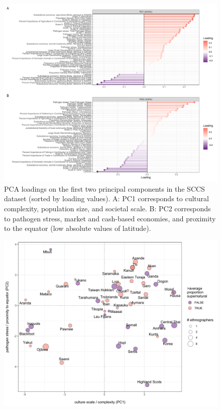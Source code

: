 \documentclass[
  11pt,
]{article}
\begin{document}
\begin{landscape}

\begin{figure}[p]

{\centering \includegraphics{magic-healers-article2_files/figure-latex/sccsPCAloadings-1} 

}

\caption{PCA loadings on the first two principal components in the SCCS dataset (sorted by loading values). A: PC1 corresponds to cultural complexity, population size, and societal scale. B: PC2 corresponds to pathogen stress, market and cash-based economies, and proximity to the equator (low absolute values of latitude).}\label{fig:sccsPCAloadings}
\end{figure}



\begin{figure}[p]

{\centering \includegraphics{magic-healers-article2_files/figure-latex/sccsBiplot-1} 

}
\end{figure}
\end{landscape}
\end{document}

